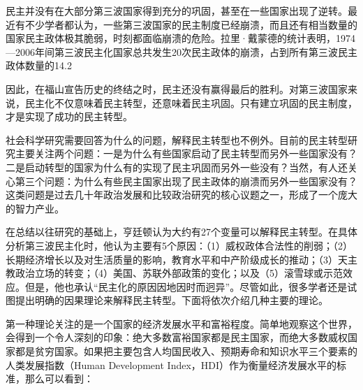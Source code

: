 
民主并没有在大部分第三波国家得到充分的巩固，甚至在一些国家出现了逆转。最近有不少学者都认为，一些第三波国家的民主制度已经崩溃，而且还有相当数量的国家民主政体极其脆弱，时刻都面临崩溃的危险。拉里·戴蒙德的统计表明，1974—2006年间第三波民主化国家总共发生20次民主政体的崩溃，占到所有第三波民主政体数量的14.2%

因此，在福山宣告历史的终结之时，民主还没有赢得最后的胜利。对第三波国家来说，民主化不仅意味着民主转型，还意味着民主巩固。只有建立巩固的民主制度，才是实现了成功的民主转型。


社会科学研究需要回答为什么的问题，解释民主转型也不例外。目前的民主转型研究主要关注两个问题：一是为什么有些国家启动了民主转型而另外一些国家没有？二是启动转型的国家为什么有的实现了民主巩固而另外一些没有？当然，有人还关心第三个问题：为什么有些民主国家出现了民主政体的崩溃而另外一些国家没有？这类问题是过去几十年政治发展和比较政治研究的核心议题之一，形成了一个庞大的智力产业。

在总结以往研究的基础上，亨廷顿认为大约有27个变量可以解释民主转型。在具体分析第三波民主化时，他认为主要有5个原因：（1）威权政体合法性的削弱；（2）长期经济增长以及对生活质量的影响，教育水平和中产阶级成长的推动；（3）天主教政治立场的转变；（4）美国、苏联外部政策的变化；以及（5）滚雪球或示范效应。但是，他也承认“民主化的原因因地因时而迥异”。尽管如此，很多学者还是试图提出明确的因果理论来解释民主转型。下面将依次介绍几种主要的理论。

第一种理论关注的是一个国家的经济发展水平和富裕程度。简单地观察这个世界，会得到一个令人深刻的印象：绝大多数富裕国家都是民主国家，而绝大多数威权国家都是贫穷国家。如果把主要包含人均国民收入、预期寿命和知识水平三个要素的人类发展指数（Human Development Index，HDI）作为衡量经济发展水平的标准，那么可以看到：


